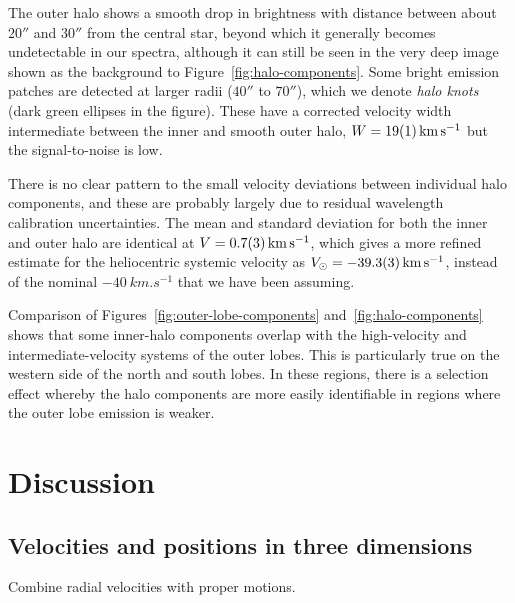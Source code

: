 \documentclass[useAMS, usenatbib]{mnras}
\begin{document}
The outer halo shows a smooth drop in brightness with distance
between about \(20''\) and \(30''\) from the central star,
beyond which it generally becomes undetectable in our spectra,
although it can still be seen in the very deep image shown as the background to Figure~\ref{fig:halo-components}.
Some bright emission patches are detected at larger radii
(\(40''\) to \(70''\)),
which we denote \textit{halo knots} (dark green ellipses in the figure).
These have a corrected velocity width intermediate between the inner and smooth outer halo,
\(W = \SI{19 \pm 1}{km.s^{-1}}\) but the signal-to-noise is low.

There is no clear pattern to the small velocity deviations between individual halo components,
and these are probably largely due to residual wavelength calibration uncertainties.
The mean and standard deviation for both the inner and outer halo are identical at \(V = \SI{+0.7 \pm 0.3}{km.s^{-1}}\),
which gives a more refined estimate for the heliocentric systemic velocity as
\(V_\odot = \SI{-39.3 \pm 0.3}{km.s^{-1}} \),
instead of the nominal \(\SI{-40}{km.s^{-1}}\) that we have been assuming.

Comparison of Figures~\ref{fig:outer-lobe-components} and~\ref{fig:halo-components}
shows that some inner-halo components overlap with the high-velocity and intermediate-velocity systems of the outer lobes.
This is particularly true on the western side of the north and south lobes.
In these regions, there is a selection effect whereby
the halo components are more easily identifiable in regions where the outer lobe emission is weaker. 

\section{Discussion}
\label{sec:discussion}

\subsection{Velocities and positions in three dimensions}
\label{sec:veloc-posit-three}

Combine radial velocities with proper motions.
\end{document}
